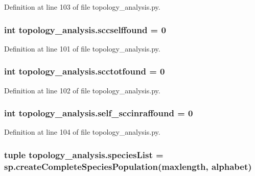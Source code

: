 Definition at line 103 of file topology\+\_\+analysis.\+py.

\hypertarget{a00159_aeacefe088f3283ea0e80ee31c0486d6d}{
\subsubsection[{sccselffound}]{\setlength{\rightskip}{0pt plus 5cm}int topology\+\_\+analysis.\+sccselffound = 0}}\label{a00159_aeacefe088f3283ea0e80ee31c0486d6d}


Definition at line 101 of file topology\+\_\+analysis.\+py.

\hypertarget{a00159_ac05c0aaedb357a42df2d5f3915bbedfa}{
\subsubsection[{scctotfound}]{\setlength{\rightskip}{0pt plus 5cm}int topology\+\_\+analysis.\+scctotfound = 0}}\label{a00159_ac05c0aaedb357a42df2d5f3915bbedfa}


Definition at line 102 of file topology\+\_\+analysis.\+py.

\hypertarget{a00159_a4d888d782ac3414961c2b844bed8b1bd}{
\subsubsection[{self\+\_\+sccinraffound}]{\setlength{\rightskip}{0pt plus 5cm}int topology\+\_\+analysis.\+self\+\_\+sccinraffound = 0}}\label{a00159_a4d888d782ac3414961c2b844bed8b1bd}


Definition at line 104 of file topology\+\_\+analysis.\+py.

\hypertarget{a00159_a5bfc4cfa78ac777159cb0ca9c9c5c2f6}{
\subsubsection[{species\+List}]{\setlength{\rightskip}{0pt plus 5cm}tuple topology\+\_\+analysis.\+species\+List = sp.\+create\+Complete\+Species\+Population(maxlength, {\bf alphabet})}}\label{a00159_a5bfc4cfa78ac777159cb0ca9c9c5c2f6}


